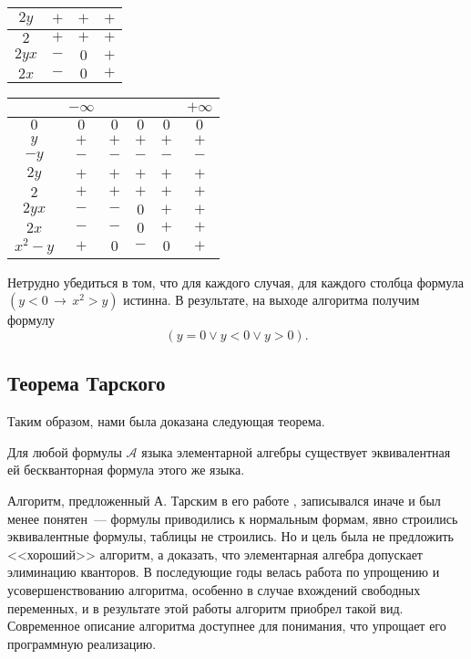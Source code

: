 \begin{enumerate}
\begin{center}
\begin{tabular}{|c|c|c|c|}
            \hline
            $2y$ & $+$ & $+$ & $+$\\
            \hline
            $2$ & $+$ & $+$ & $+$\\
            \hline
            $2yx$ & $-$ & $0$ & $+$\\
            \hline
            $2x$ & $-$ & $0$ & $+$\\
            \hline
        \end{tabular} 
            \quad 
        \begin{tabular}{|c|c|c|c|c|c|}
            \hline
             & $-\infty$ & & & & $+\infty$\\
            \hline
            $0$ & $0$ & $0$ & $0$ & $0$ & $0$\\
            \hline
            $y$ & $+$ & $+$ & $+$ & $+$ & $+$\\
            \hline
            $-y$ & $-$ & $-$ & $-$ & $-$ & $-$\\
            \hline
            $2y$ & $+$ & $+$ & $+$ & $+$ & $+$\\
            \hline
            $2$ & $+$ & $+$ & $+$ & $+$ & $+$\\
            \hline
            $2yx$ & $-$ & $-$ & $0$ & $+$ & $+$\\
            \hline
            $2x$ & $-$ & $-$ & $0$ & $+$ & $+$\\
            \hline
            $x^2 - y$ & $+$ & $0$ & $-$ & $0$ & $+$\\
            \hline
        \end{tabular} 
            \quad       
    \end{center}
\end{enumerate}
Нетрудно убедиться в том, что для каждого случая, для каждого столбца формула $(y < 0 \, \to \, x^2 > y)$ истинна. В результате, на выходе алгоритма получим формулу
\begin{equation*}
    (y = 0 \lor y < 0 \lor y > 0).
\end{equation*}

\subsection{Теорема Тарского}

Таким образом, нами была доказана следующая теорема.

\begin{theorem}
    Для любой формулы $\mathcal{A}$ языка элементарной алгебры существует эквивалентная ей бескванторная формула этого же языка.
\end{theorem}


Алгоритм, предложенный А. Тарским в его работе \cite{Tarski}, записывался иначе и был менее понятен~--- формулы приводились к нормальным формам, явно строились эквивалентные формулы, таблицы не строились. Но и цель была не предложить <<хороший>> алгоритм, а доказать, что элементарная алгебра допускает элиминацию кванторов. В последующие годы велась работа по упрощению и усовершенствованию алгоритма, особенно в случае вхождений свободных переменных, и в результате этой работы алгоритм приобрел такой вид. Современное описание алгоритма доступнее для понимания, что упрощает его программную реализацию.